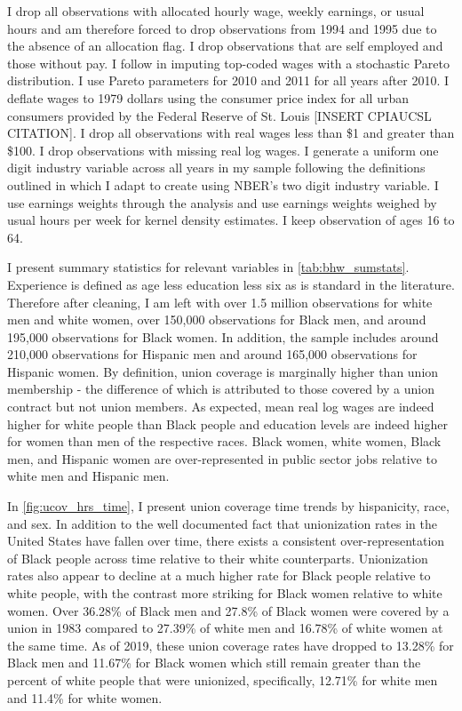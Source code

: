 \documentclass[11pt]{article}
\begin{document}
I drop all observations with allocated hourly wage, weekly earnings, or usual hours and am therefore forced to drop observations from 1994 and 1995 due to the absence of an allocation flag. I drop observations that are self employed and those without pay. I follow \citet{fll2021} in imputing top-coded wages with a stochastic Pareto distribution. I use Pareto parameters for 2010 and 2011 for all years after 2010. I deflate wages to 1979 dollars using the consumer price index for all urban consumers provided by the Federal Reserve of St. Louis [INSERT CPIAUCSL CITATION]. I drop all observations with real wages less than \$1 and greater than \$100. I drop observations with missing real log wages. I generate a uniform one digit industry variable across all years in my sample following the definitions outlined in \citet{fll2021} which I adapt to create using NBER's two digit industry variable. I use earnings weights through the analysis and use earnings weights weighed by usual hours per week for kernel density estimates. I keep observation of ages 16 to 64.

I present summary statistics for relevant variables in \autoref{tab:bhw_sumstats}. Experience is defined as age less education less six as is standard in the literature. Therefore after cleaning, I am left with over 1.5 million observations for white men and white women, over 150,000 observations for Black men, and around 195,000 observations for Black women. In addition, the sample includes around 210,000 observations for Hispanic men and around 165,000 observations for Hispanic women. By definition, union coverage is marginally higher than union membership - the difference of which is attributed to those covered by a union contract but not union members. As expected, mean real log wages are indeed higher for white people than Black people and education levels are indeed higher for women than men of the respective races. Black women, white women, Black men, and Hispanic women are over-represented in public sector jobs relative to white men and Hispanic men. 

In \autoref{fig:ucov_hrs_time}, I present union coverage time trends by hispanicity, race, and sex. In addition to the well documented fact that unionization rates in the United States have fallen over time, there exists a consistent over-representation of Black people across time relative to their white counterparts. Unionization rates also appear to decline at a much higher rate for Black people relative to white people, with the contrast more striking for Black women relative to white women. Over 36.28\% of Black men and 27.8\% of Black women were covered by a union in 1983 compared to 27.39\% of white men and 16.78\% of white women at the same time. As of 2019, these union coverage rates have dropped to 13.28\% for Black men and 11.67\% for Black women which still remain greater than the percent of white people that were unionized, specifically, 12.71\% for white men and 11.4\% for white women. 
\end{document}
